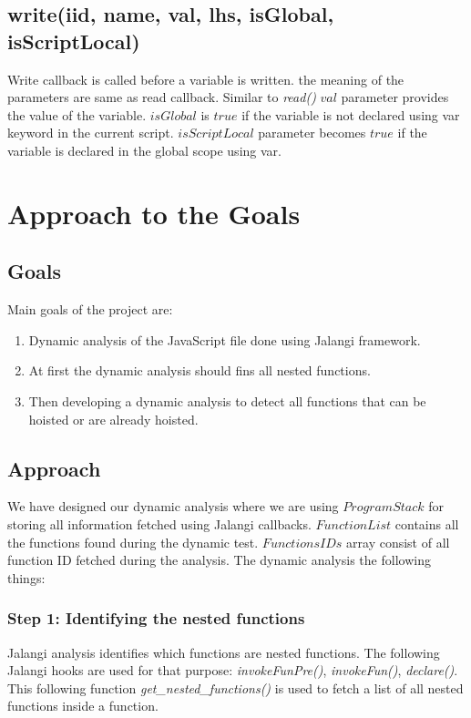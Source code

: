 \documentclass[accentcolor=tud0b,12pt,paper=a4]{tudreport}
\begin{document}
\section{write(iid, name, val, lhs, isGlobal, isScriptLocal)}
Write callback is called before a variable is written. the meaning of the parameters are same as read callback. Similar to \emph{read()} $val$ parameter provides the value of the variable. $isGlobal$ is $true$ if the variable is not declared using var keyword in the current script. $isScriptLocal$ parameter becomes $true$ if the variable is declared in the global scope using var.


\chapter{Approach to the Goals}
\section{Goals}
Main goals of the project are: 
\begin{enumerate}
	\item Dynamic analysis of the JavaScript file done using Jalangi framework.
	\item At first the dynamic analysis should fins all nested functions.
	\item Then developing a dynamic analysis to detect all functions that can be hoisted or are already hoisted.
\end{enumerate}
\section{Approach}
We have designed our dynamic analysis where we are using $Program Stack$ for storing all information fetched using Jalangi callbacks. $Function List$ contains all the functions found during the dynamic test. $Functions IDs$ array consist of all function ID fetched during the analysis. The dynamic analysis the following things:
\subsection{Step 1: Identifying the nested functions}
Jalangi analysis identifies which functions are nested functions. The following Jalangi hooks are used for that purpose: \emph{invokeFunPre()}, \emph{invokeFun()}, \emph{declare()}. 
This following function \emph{get\_nested\_functions()} is used to fetch a list of all nested functions inside a function.
\end{document}
